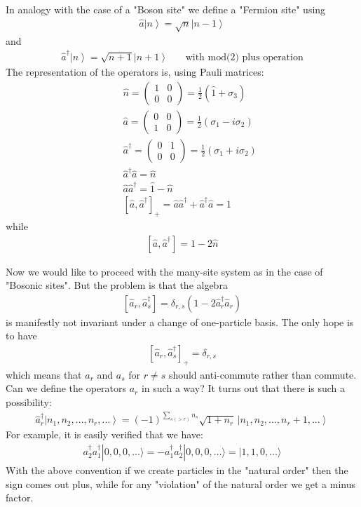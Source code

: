 \documentclass[onecolumn,fleqn]{revtex4}
\newcommand{\beq}{\begin{eqnarray}}
\newcommand{\eeq}{\end{eqnarray}}
\begin{document}
In analogy with the case of a "Boson site" we define a "Fermion site" using 
\beq
\hat{a}\left\vert n\right\rangle =\sqrt{n}\left\vert n-1\right\rangle 
\eeq
and
\beq
\hat{a}^{\dag}\left\vert n\right\rangle =\sqrt{n+1}\left\vert 
n+1\right\rangle 
\ \ \ \ \ \ \ \ \mbox{with mod(2) plus operation}
\eeq
The representation of the operators is, using Pauli matrices:
\beq
&& \hat{n}=  
\begin{pmatrix} 
1 & 0\\ 
0 & 0 
\end{pmatrix} 
=\frac{1}{2}\left(\hat{1}+\sigma_{3}\right) 
\\ \nonumber
&& \hat{a}= 
\begin{pmatrix} 
0 & 0\\ 
1 & 0 
\end{pmatrix} 
=\frac{1}{2}\left(  \sigma_{1}-i\sigma_{2}\right) 
\\ \nonumber
&& \hat{a}^{\dag}=  
\begin{pmatrix} 
0 & 1\\ 
0 & 0 
\end{pmatrix} 
=\frac{1}{2}\left(\sigma_{1}+i\sigma_{2}\right) 
\\ \nonumber
&& \hat{a}^{\dag}\hat{a} = \hat{n}
\\ \nonumber
&& \hat{a}\hat{a}^{\dag} = \hat{1} - \hat{n}
\\ \nonumber
&& \left[ \hat{a},\hat{a}^{\dag}\right]_{+}
=\hat{a}\hat{a}^{\dag}+\hat{a}^{\dag}\hat{a} = 1 
\eeq
while 
\beq
\left[\hat{a},\hat{a}^{\dag}\right] = 1-2\hat{n}
\eeq


Now we would like to proceed with the many-site system  
as in the case of "Bosonic sites". But the problem is that 
the algebra 
\beq
\left[\hat{a}_r,\hat{a}_s^{\dag}\right] 
= \delta_{r,s} (1-2\hat{a}_r^{\dag}\hat{a}_r)
\eeq
is manifestly not invariant under a change 
of one-particle basis. The only hope is to 
have 
\beq
\left[\hat{a}_r,\hat{a}_s^{\dag}\right]_{+} = \delta_{r,s} 
\eeq
which means that $a_r$ and $a_s$ for $r\ne s$ 
should anti-commute rather than commute. 
Can we define the operators $a_r$ in such 
a way? It turns out that there is such a possibility:
\beq
\hat{a}_{r}^{\dag}
\left\vert n_{1},n_{2}, \dots ,n_{r}, \dots \right\rangle 
= (-1)^{ \sum_{s(>r)} n_s }\sqrt{1+n_r}\,  
\left\vert n_{1},n_{2}, \dots ,n_{r}+1, \dots \right\rangle
\eeq
For example, it is easily verified that we have:
\beq
a_2^{\dag} a_1^{\dag} |0,0,0, \dots \rangle =
-a_1^{\dag} a_2^{\dag} |0,0,0, \dots \rangle =
|1,1,0, \dots \rangle 
\eeq
With the above convention if we create 
particles in the "natural order" then the 
sign comes out plus, while for any  
"violation" of the natural order we get 
a minus factor.
\end{document}

